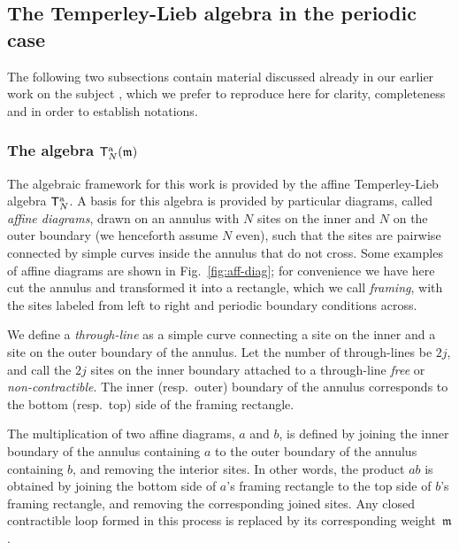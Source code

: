 \documentclass[a4paper,10pt]{article}
\newcommand{\linnea}[1]{$\framebox{\tiny L}$\ \textbf{\texttt{{\color{red}\footnotesize#1}}}}
\newcommand{\ATL}[1]{\mathsf{T}^{\rm a}_{#1}}
\newcommand{\m}{\mathfrak{m}}
\begin{document}
\subsection{The Temperley-Lieb algebra in the periodic case}\label{sec:TL-alg-def}

The following two subsections contain material  discussed already in our earlier work on the subject \cite{GRS1,GRS2,GRS3,GRSV}, which we prefer to reproduce here for clarity, completeness and in order to establish notations. 

\subsubsection{The algebra $\ATL{N}(\m)$}

The algebraic framework for this work is provided by the affine Temperley-Lieb algebra   $\ATL{N}$. A basis for this algebra is provided by particular diagrams,
called \textit{affine diagrams}, drawn on an annulus with $N$ sites on the inner and $N$ on
the outer boundary (we henceforth assume $N$ even), such that 
the sites are pairwise connected by simple curves inside the
annulus that do not cross. Some examples of affine diagrams are shown in Fig.~\ref{fig:aff-diag}; for convenience we have here cut the annulus and transformed
it into a rectangle, which we call \textit{framing}, with the sites labeled from left to right and periodic boundary conditions across.

We define a {\em through-line} as a simple curve connecting
a site on the inner and a site on the outer boundary of the
annulus. Let the number of through-lines be $2j$, and call the $2j$ sites on the inner boundary attached to a through-line {\em free} or
{\em non-contractible}. The inner (resp.\ outer) boundary of the annulus corresponds to the bottom (resp.\ top) side of the framing rectangle.

The multiplication of two affine diagrams, $a$ and $b$, is defined by joining the inner boundary of the annulus containing $a$ to the outer boundary of the annulus containing $b$, and
removing the interior sites. In other words, the product $ab$ is obtained by joining the bottom side of $a$'s framing rectangle to the top side of $b$'s framing
rectangle, and removing the corresponding joined sites. Any closed contractible loop formed in this process
is replaced by its corresponding weight~$\m$.
\end{document}
